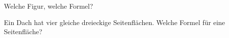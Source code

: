 \setcounter{aufgabe}{8}

\begin{aufgabe}{Welche Figur, welche Formel?}
\begin{teile}
\teil Ein Dach hat vier gleiche dreieckige Seitenflächen. Welche Formel für eine Seitenfläche? \\  \\  \\ 
\end{teile}
\end{aufgabe}

